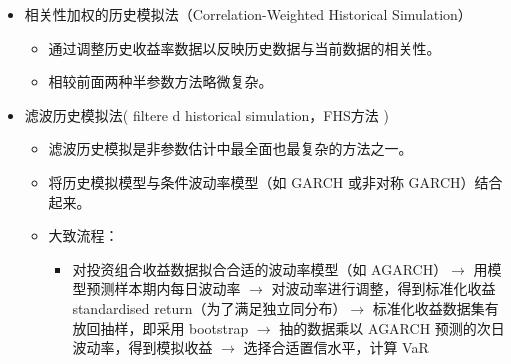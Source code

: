 \begin{itemize}
可以用 \(r_{t，i}^*\)  来代替  \(r_{t，i}\)，计算 VaR 值。



\begin{knowledgebox}{BRW法的优点：}
    \begin{enumerate}

    \item 以一种自然直接的方式考虑了波动性的变化。
    
    
\item \underline {对当前的波动率比较敏感}，因为所有的损失数据都是站在当前的波动率
角度考虑。在刚刚的例子中，当前的波动率是6\%，如果变成0.6\%，所有的损益
数据都等比例缩小了十倍。那么，算出来的VaR也缩小了十倍。


\item 用这种方法得到的VaR 和ES，\underline {有可能计算出超过历史数据集中出现的
最大损失}。这是HW方法的特点。在BRW方法中，是不会出现一个比历史损失
更大的数值的VaR或ES，因为没有对损失进行调整，只是调整了权重。


\item 对于VaR估计，这个方法优于BRW方法。当然这个是Hull 的观点。
\end{enumerate}
\end{knowledgebox}


    \item 相关性加权的历史模拟法（Correlation-Weighted Historical Simulation）
  \begin{itemize}
    
    \item 通过调整历史收益率数据以反映历史数据与当前数据的相关性。

    \item 相较前面两种半参数方法略微复杂。
\end{itemize}  



    \item 滤波历史模拟法( filtere d historical simulation，FHS方法 )
    
    \begin{itemize}
        \item 滤波历史模拟是非参数估计中最全面也最复杂的方法之一。
        
        \item 将历史模拟模型与条件波动率模型（如 GARCH 或非对称 GARCH）结合起来。
        
        \item 大致流程：
        \begin{itemize}
            \item 对投资组合收益数据拟合合适的波动率模型（如 AGARCH）$\rightarrow$ 用模型预测样本期内每日波动率 $\rightarrow$ 对波动率进行调整，得到标准化收益 standardised return（为了满足独立同分布）$\rightarrow$ 标准化收益数据集有放回抽样，即采用 bootstrap $\rightarrow$ 抽的数据乘以 AGARCH 预测的次日波动率，得到模拟收益 $\rightarrow$ 选择合适置信水平，计算 VaR
        \end{itemize}
        

\end{itemize}
\end{itemize}
